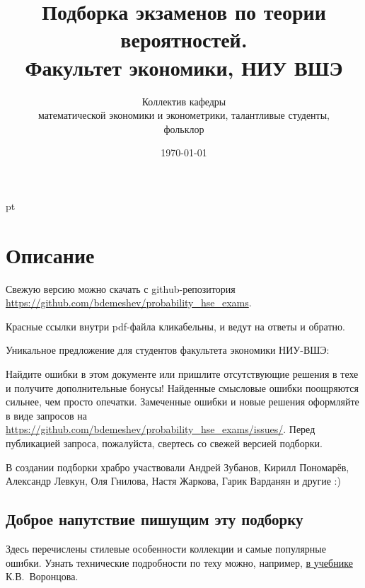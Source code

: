 \documentclass[11pt, a4paper]{article}
\title{Подборка экзаменов по теории вероятностей. \\Факультет экономики, НИУ ВШЭ}
\date{\today}
\author{Коллектив кафедры \\
математической экономики и эконометрики,
талантливые студенты,\\
 фольклор}
\begin{document}
\maketitle

\tableofcontents{}


 pt %

\clearpage
\section*{Описание}

Свежую версию можно скачать с github-репозитория \url{https://github.com/bdemeshev/probability_hse_exams}.

Красные ссылки внутри pdf-файла кликабельны, и ведут на ответы и обратно.


Уникальное предложение для студентов факультета экономики НИУ-ВШЭ:

Найдите ошибки в этом документе или пришлите отсутствующие решения в техе и получите
дополнительные бонусы!
Найденные смысловые ошибки поощряются сильнее, чем просто опечатки.
Замеченные ошибки и новые решения оформляйте в виде запросов на
\url{https://github.com/bdemeshev/probability_hse_exams/issues/}.
Перед публикацией запроса, пожалуйста, свертесь со свежей версией подборки.

В создании подборки храбро участвовали
Андрей Зубанов, Кирилл Пономарёв, Александр Левкун, Оля Гнилова,
Настя Жаркова, Гарик Варданян и другие :)


\subsection*{Доброе напутствие пишущим эту подборку}

Здесь перечислены стилевые особенности коллекции и самые популярные ошибки.
Узнать технические подробности по теху можно, например,
\href{http://www.ccas.ru/voron/download/voron05latex.pdf}{в учебнике} К.В. Воронцова.
\end{document}
